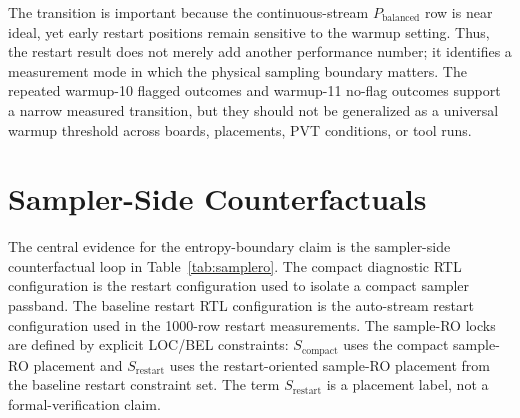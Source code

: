 \documentclass[journal]{IEEEtran}
\newcommand{\pbal}{$P_\mathrm{balanced}$}
\newcommand{\scompact}{$S_\mathrm{compact}$}
\newcommand{\srestart}{$S_\mathrm{restart}$}
\begin{document}
The transition is important because the continuous-stream \pbal{} row is near ideal, yet early restart positions remain sensitive to the warmup setting. Thus, the restart result does not merely add another performance number; it identifies a measurement mode in which the physical sampling boundary matters. The repeated warmup-10 flagged outcomes and warmup-11 no-flag outcomes support a narrow measured transition, but they should not be generalized as a universal warmup threshold across boards, placements, PVT conditions, or tool runs.

\section{Sampler-Side Counterfactuals}

The central evidence for the entropy-boundary claim is the sampler-side counterfactual loop in Table~\ref{tab:samplero}. The compact diagnostic RTL configuration is the restart configuration used to isolate a compact sampler passband. The baseline restart RTL configuration is the auto-stream restart configuration used in the 1000-row restart measurements. The sample-RO locks are defined by explicit LOC/BEL constraints: \scompact{} uses the compact sample-RO placement and \srestart{} uses the restart-oriented sample-RO placement from the baseline restart constraint set. The term \srestart{} is a placement label, not a formal-verification claim.
\end{document}
